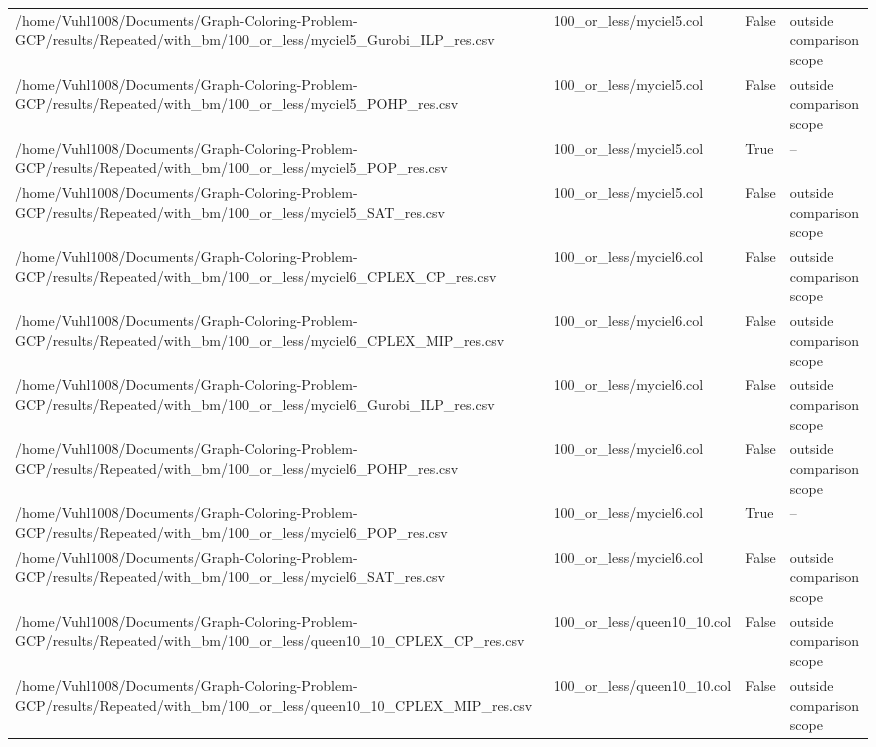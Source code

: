 \begin{table}[htbp]
\begin{tabular}{llll}
/home/Vuhl1008/Documents/Graph-Coloring-Problem-GCP/results/Repeated/with\_bm/100\_or\_less/myciel5\_Gurobi\_ILP\_res.csv & 100\_or\_less/myciel5.col & False & outside comparison scope \\
/home/Vuhl1008/Documents/Graph-Coloring-Problem-GCP/results/Repeated/with\_bm/100\_or\_less/myciel5\_POHP\_res.csv & 100\_or\_less/myciel5.col & False & outside comparison scope \\
/home/Vuhl1008/Documents/Graph-Coloring-Problem-GCP/results/Repeated/with\_bm/100\_or\_less/myciel5\_POP\_res.csv & 100\_or\_less/myciel5.col & True & -- \\
/home/Vuhl1008/Documents/Graph-Coloring-Problem-GCP/results/Repeated/with\_bm/100\_or\_less/myciel5\_SAT\_res.csv & 100\_or\_less/myciel5.col & False & outside comparison scope \\
/home/Vuhl1008/Documents/Graph-Coloring-Problem-GCP/results/Repeated/with\_bm/100\_or\_less/myciel6\_CPLEX\_CP\_res.csv & 100\_or\_less/myciel6.col & False & outside comparison scope \\
/home/Vuhl1008/Documents/Graph-Coloring-Problem-GCP/results/Repeated/with\_bm/100\_or\_less/myciel6\_CPLEX\_MIP\_res.csv & 100\_or\_less/myciel6.col & False & outside comparison scope \\
/home/Vuhl1008/Documents/Graph-Coloring-Problem-GCP/results/Repeated/with\_bm/100\_or\_less/myciel6\_Gurobi\_ILP\_res.csv & 100\_or\_less/myciel6.col & False & outside comparison scope \\
/home/Vuhl1008/Documents/Graph-Coloring-Problem-GCP/results/Repeated/with\_bm/100\_or\_less/myciel6\_POHP\_res.csv & 100\_or\_less/myciel6.col & False & outside comparison scope \\
/home/Vuhl1008/Documents/Graph-Coloring-Problem-GCP/results/Repeated/with\_bm/100\_or\_less/myciel6\_POP\_res.csv & 100\_or\_less/myciel6.col & True & -- \\
/home/Vuhl1008/Documents/Graph-Coloring-Problem-GCP/results/Repeated/with\_bm/100\_or\_less/myciel6\_SAT\_res.csv & 100\_or\_less/myciel6.col & False & outside comparison scope \\
/home/Vuhl1008/Documents/Graph-Coloring-Problem-GCP/results/Repeated/with\_bm/100\_or\_less/queen10\_10\_CPLEX\_CP\_res.csv & 100\_or\_less/queen10\_10.col & False & outside comparison scope \\
/home/Vuhl1008/Documents/Graph-Coloring-Problem-GCP/results/Repeated/with\_bm/100\_or\_less/queen10\_10\_CPLEX\_MIP\_res.csv & 100\_or\_less/queen10\_10.col & False & outside comparison scope \\

\end{tabular}
\end{table}
